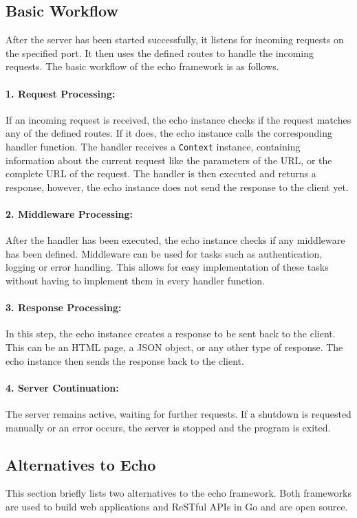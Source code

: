 \subsection{Basic Workflow}
\label{subsec:echo_basic_workflow}
After the server has been started successfully, it listens for incoming requests on the specified port.
It then uses the defined routes to handle the incoming requests.
The basic workflow of the echo framework is as follows.

\paragraph*{1. Request Processing:}
If an incoming request is received, the echo instance checks if the request matches any of the defined routes.
If it does, the echo instance calls the corresponding handler function.
The handler receives a \texttt{Context} instance, containing information about the current request like the parameters of the URL, or the complete URL of the request.
The handler is then executed and returns a response, however, the echo instance does not send the response to the client yet.

\paragraph*{2. Middleware Processing:}
After the handler has been executed, the echo instance checks if any middleware has been defined.
Middleware can be used for tasks such as authentication, logging or error handling.
This allows for easy implementation of these tasks without having to implement them in every handler function.

\paragraph*{3. Response Processing:}
In this step, the echo instance creates a response to be sent back to the client.
This can be an HTML page, a JSON object, or any other type of response.
The echo instance then sends the response back to the client.

\paragraph*{4. Server Continuation:}
The server remains active, waiting for further requests.
If a shutdown is requested manually or an error occurs, the server is stopped and the program is exited.

\subsection{Alternatives to Echo}
This section briefly lists two alternatives to the echo framework.
Both frameworks are used to build web applications and ReSTful APIs in Go and are open source.

